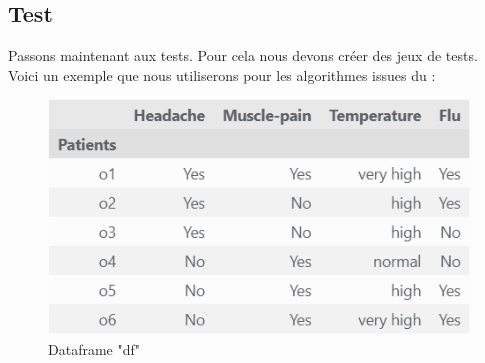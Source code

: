 \subsection{Test}
Passons maintenant aux tests. Pour cela nous devons créer des jeux de
tests. Voici un exemple que nous utiliserons pour les algorithmes
issues du \rst : \\
\begin{figure}[h!]
	\centering
	\includegraphics[scale=0.8]{img/df_exemple_1.PNG}
	\caption{Dataframe "df"}
	\label{fig:df_exemple_1}
\end{figure}
